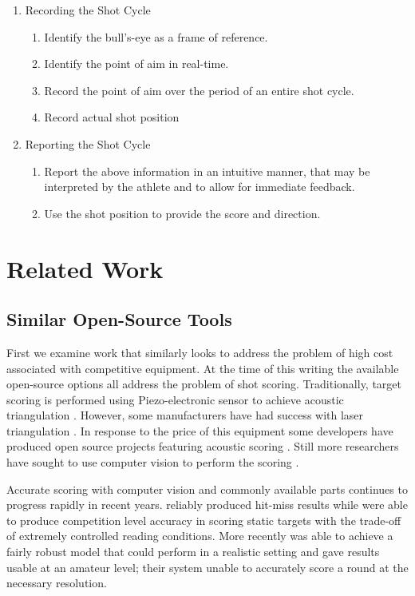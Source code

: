 \documentclass[conference]{IEEEtran}
\begin{document}
\begin{enumerate}
	\item Recording the Shot Cycle
	\begin{enumerate}
		\item Identify the bull's-eye as a frame of reference.
		\item Identify the point of aim in real-time.
		\item Record the point of aim over the period of an entire shot cycle.
		\item Record actual shot position
	\end{enumerate}
	\item Reporting the Shot Cycle
	\begin{enumerate}
		\item Report the above information in an intuitive manner, that may be interpreted by the athlete and to allow for immediate feedback.
		\item Use the shot position to provide the score and direction.
	\end{enumerate}
\end{enumerate}


\section{Related Work}

\subsection{Similar Open-Source Tools}

First we examine work that similarly looks to address the problem of high cost associated with competitive equipment.
At the time of this writing the available open-source options all address the problem of shot scoring.
Traditionally, target scoring is performed using Piezo-electronic sensor to achieve acoustic triangulation \cite{Anderson2018}.
However, some manufacturers have had success with laser triangulation \cite{SUIS}.
In response to the price of this equipment some developers have produced open source projects featuring acoustic scoring \cite{etarg, freetarget}.
Still more researchers have sought to use computer vision to perform the scoring \cite{Rudzinski2012, Stenhager2021}.

Accurate scoring with computer vision and commonly available parts continues to progress rapidly in recent years.
\cite{Ye2011} reliably produced  hit-miss results while \cite{Rudzinski2012} were able to produce competition level accuracy in scoring static targets with the trade-off of extremely controlled reading conditions.
More recently \cite{Stenhager2021} was able to achieve a fairly robust model that could perform in a realistic setting and gave results usable at an amateur level; their system unable to accurately score a round at the necessary resolution.
\end{document}
